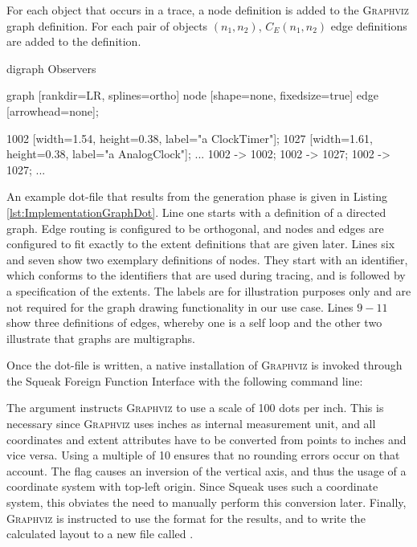 For each object that occurs in a trace, a node definition is added to the \textsc{Graphviz} graph definition.
For each pair of objects $(n_1, n_2)$, $C_E(n_1, n_2)$ edge definitions are added to the definition.

\begin{graphviz}[caption={Exemplary definition of a \textsc{Graphviz} graph, consisting of two nodes and three directed edges.}, label=lst:ImplementationGraphDot]
digraph Observers {
	graph [rankdir=LR, splines=ortho]
	node [shape=none, fixedsize=true]
	edge [arrowhead=none];
	
	1002 [width=1.54, height=0.38, label="a ClockTimer"];
	1027 [width=1.61, height=0.38, label="a AnalogClock"];
	...
	1002 -> 1002;
	1002 -> 1027;
	1002 -> 1027;
	...
}
\end{graphviz}

An example dot-file that results from the generation phase is given in Listing \ref{lst:ImplementationGraphDot}.
Line one starts with a definition of a directed graph.
Edge routing is configured to be orthogonal, and nodes and edges are configured to fit exactly to the extent definitions that are given later.
Lines six and seven show two exemplary definitions of nodes.
They start with an identifier, which conforms to the identifiers that are used during tracing, and is followed by a specification of the extents.
The labels are for illustration purposes only and are not required for the graph drawing functionality in our use case.
Lines $9-11$ show three definitions of edges, whereby one is a self loop and the other two illustrate that graphs are multigraphs.

Once the dot-file is written, a native installation of \textsc{Graphviz} is invoked through the Squeak Foreign Function Interface with the following command line:
\begin{center}
\end{center}
The  argument instructs \textsc{Graphviz} to use a scale of 100 dots per inch.
This is necessary since \textsc{Graphviz} uses inches as internal measurement unit, and all coordinates and extent attributes have to be converted from points to inches and vice versa.
Using a multiple of 10 ensures that no rounding errors occur on that account.
The  flag causes an inversion of the vertical axis, and thus the usage of a coordinate system with top-left origin.
Since Squeak uses such a coordinate system, this obviates the need to manually perform this conversion later.
Finally, \textsc{Graphviz} is instructed to use the  format for the results, and to write the calculated layout to a new file called .

